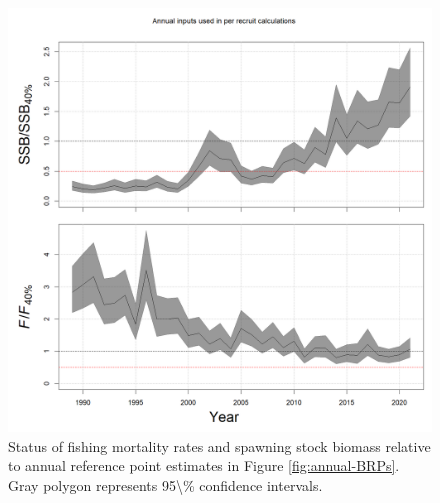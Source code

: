 \documentclass[
]{article}
\begin{document}
\begin{figure}

{\centering \includegraphics[width=1\linewidth]{../2023.RT.Runs/Run34/plots_png/ref_points/FSPR_relative} 

}

\caption{Status of fishing mortality rates and spawning stock biomass relative to annual reference point estimates in Figure \ref{fig:annual-BRPs}. Gray polygon represents 95\textbackslash\% confidence intervals.}\label{fig:annual-status}
\end{figure}
\end{document}
